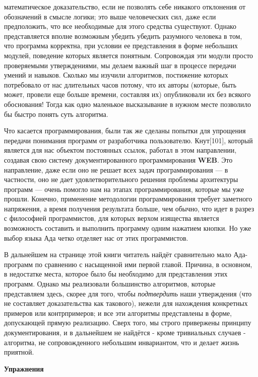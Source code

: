 \noindent математическое доказательство, если не позволять себе никакого отклонения от обозначений в смысле логики; это выше человеческих сил, даже если предположить, что все необходимые для этого средства существуют. Однако представляется вполне возможным убедить убедить разумного человека в том, что программа корректна, при условии ее представления в форме небольших модулей, поведение которых является понятным. Сопровождая эти модули просто проверяемыми утверждениями, мы делаем важный шаг в процессе передачи умений и навыков. Сколько мы изучили алгоритмов, постижение которых потребовало от нас длительных часов потому, что их авторы (которые, быть может, провели еще больше времени, составляя их) опубликовали их без всякого обоснования! Тогда как одно маленькое высказывание в нужном месте позволило бы быстро понять суть алгоритма. 

Что касается программирования, были так же сделаны попытки для упрощения передачи понимания программ от разработчика пользователю. Кнут[101], который является для нас объектом постоянных ссылок, работал в этом направлении, создавая свою систему документированного программирования \textbf{WEB}. Это направление, даже если оно не решает всех задач программирования --- в частности, оно не дает удовлетворительного решения проблемы архитектуры программ --- очень помогло нам на этапах программирования, которые мы уже прошли. Конечно, применение методологии программирования требует заметного напряжения, а время получения результата больше, чем обычно, что идет в разрез с философией программистов, для которых верхом изящества является возможность составить и выполнить программу одним нажатием кнопки. Но уже выбор языка Ада четко отделяет нас от этих программистов.

В дальнейшем на странице этой книги читатель найдёт сравнительно мало Ада-программ по сравнению с насыщенной ими первой главой. Причина, в основном, в недостатке места, которое было бы необходимо для представления этих программ. Однако мы реализовали большинство алгоритмов, которые представляем здесь, скорее для того, чтобы \textit{подтвердить} наши утверждения (что не составляет доказательства как такового), нежели для нахождения конкретных примеров или контрпримеров; и все эти алгоритмы представлены в форме, допускающей прямую реализацию. Сверх того, мы строго привержены принципу документирования, и в дальнейшем не найдётся - кроме тривиальных случаев - алгоритма, не сопровожденного небольшим инвариантом, что и делает жизнь приятной.
\newpage
\begin{center}
\textbf{Упражнения}
\end{center}
